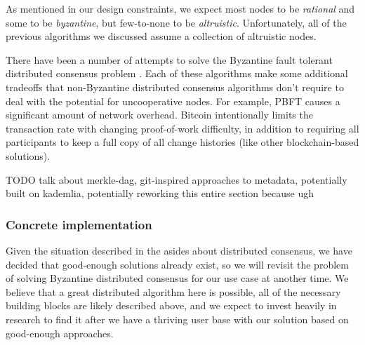 \documentclass[a4paper,10pt]{article} \usepackage[utf8]{inputenc}
\newcommand{\todo}[1]{{\color{red} TODO #1 }}
\begin{document}
As mentioned in our design constraints, we expect most nodes to be {\em
rational} and some to be {\em byzantine}, but few-to-none to be {\em
altruistic}. Unfortunately, all of the previous algorithms we discussed assume a
collection of altruistic nodes.

There have been a number of attempts to solve the Byzantine fault tolerant
distributed consensus problem
\cite{bitcoin,pbft,qu,fab,fab-revisited,zyzzyva,rbft,
tangaroa,tendermint,aliph,hashgraph,honeybadger,algorand,casper,
tangle,avalanche,parsec,mickens-bft}. Each of these algorithms make some
additional tradeoffs that non-Byzantine distributed consensus algorithms don't
require to deal with the potential for uncooperative nodes. For example,
PBFT \cite{pbft} causes a significant amount of network overhead. Bitcoin
\cite{bitcoin} intentionally limits the transaction rate with changing
proof-of-work difficulty, in addition to requiring all participants to keep a
full copy of all change histories (like other blockchain-based
solutions).



\todo{talk about merkle-dag, git-inspired approaches to metadata, potentially
built on kademlia, potentially reworking this entire section because ugh}

\subsubsection{Concrete implementation}

Given the situation described in the asides about distributed consensus, we have
decided that good-enough solutions already exist, so we will revisit the
problem of solving Byzantine distributed consensus for our use
case at another time. We believe that a great distributed algorithm here is
possible, all of the necessary building blocks are likely described above, and
we expect to invest heavily in research to find it after we have a thriving user
base with our solution based on good-enough approaches.
\end{document}
